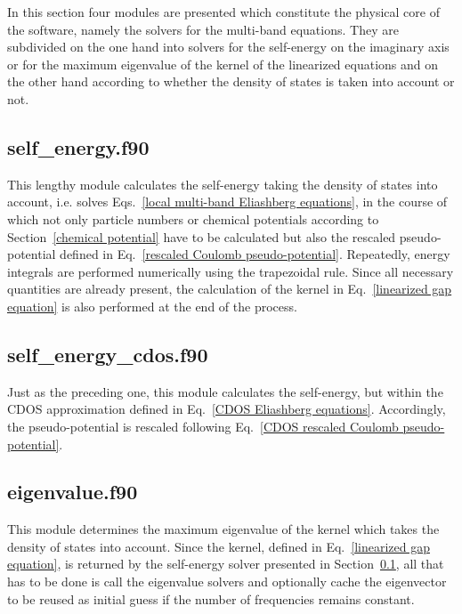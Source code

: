 In this section four modules are presented which constitute the physical core of
the software, namely the solvers for the multi-band  equations.
They are subdivided on the one hand into solvers for the self-energy on the
imaginary axis or for the maximum eigenvalue of the kernel of the linearized
equations and on the other hand according to whether the density of states is
taken into account or not.

\subsection{self\_energy.f90}
\label{self_energy.f90}

This lengthy module calculates the self-energy taking the density of states into
account, i.e. solves Eqs.~\ref{local multi-band Eliashberg equations}, in the
course of which not only particle numbers or chemical potentials according to
Section~\ref{chemical potential} have to be calculated but also the rescaled
 pseudo-potential defined in Eq.~\ref{rescaled Coulomb
pseudo-potential}. Repeatedly, energy integrals are performed numerically using
the trapezoidal rule. Since all necessary quantities are already present, the
calculation of the kernel in Eq.~\ref{linearized gap equation} is also performed
at the end of the process.



\subsection{self\_energy\_cdos.f90}

Just as the preceding one, this module calculates the self-energy, but within
the CDOS approximation defined in Eq.~\ref{CDOS Eliashberg equations}.
Accordingly, the  pseudo-potential is rescaled following
Eq.~\ref{CDOS rescaled Coulomb pseudo-potential}.



\subsection{eigenvalue.f90}

This module determines the maximum eigenvalue of the  kernel
which takes the density of states into account. Since the kernel, defined in
Eq.~\ref{linearized gap equation}, is returned by the self-energy solver
presented in Section~\ref{self_energy.f90}, all that has to be done is call the
eigenvalue solvers and optionally cache the eigenvector to be reused as initial
guess if the number of  frequencies remains constant.

